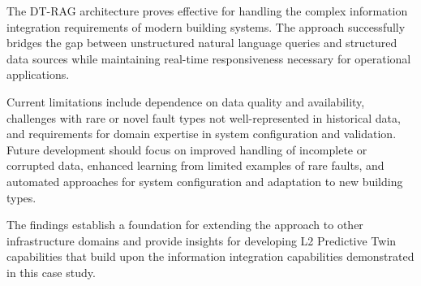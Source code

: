 The DT-RAG architecture proves effective for handling the complex information integration requirements of modern building systems. The approach successfully bridges the gap between unstructured natural language queries and structured data sources while maintaining real-time responsiveness necessary for operational applications.

Current limitations include dependence on data quality and availability, challenges with rare or novel fault types not well-represented in historical data, and requirements for domain expertise in system configuration and validation. Future development should focus on improved handling of incomplete or corrupted data, enhanced learning from limited examples of rare faults, and automated approaches for system configuration and adaptation to new building types.

The findings establish a foundation for extending the approach to other infrastructure domains and provide insights for developing L2 Predictive Twin capabilities that build upon the information integration capabilities demonstrated in this case study.
